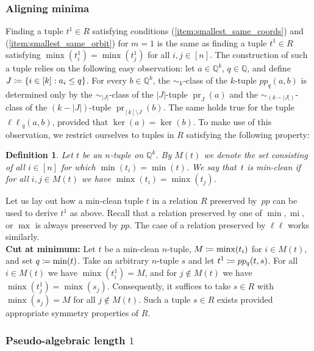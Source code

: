 \documentclass[a4paper,reqno, cleveref]{amsart}
\newcommand{\coloneqq}{\mathrel{\mathop:}\mathrel{\mkern-1.2mu}=}
\newtheorem{definition}[theorem]{Definition}
\newcommand{\Q}{\mathbb{Q}}
\newcommand{\br}[1]{[#1]}
\newcommand{\tup}{t}
\DeclareMathOperator{\pr}{pr}
\DeclareMathOperator{\mx}{mx}
\DeclareMathOperator{\mi}{mi}
\DeclareMathOperator{\minx}{minx}
\newcommand{\pp}[1]{pp_{#1}}
\newcommand{\llp}[1]{{\ell \ell}_{#1}}
\begin{document}
\subsubsection{Aligning minima}

Finding a tuple $\tup^1 \in R$ satisfying conditions (\ref{item:smallest_same_coords}) and (\ref{item:smallest_same_orbit})
for $m=1$ is the same as finding a tuple $\tup^1 \in R$ satisfying $\minx(\tup^1_i)=\minx(\tup^1_j)$ for all $i,j \in \br{n}$. The construction of such a tuple relies on the following easy observation:
%
let   $a \in \Q^k$,  $q \in \Q$, and define $J\coloneqq\{i \in \br k: a_i \leq q\}$. For every $b \in \Q^k$, the $\sim_k$-class of the $k$-tuple $\pp{q}(a,b)$  is  determined only by the $\sim_{|J|}$-class  of the $|J|$-tuple $\pr_J(a)$ and the $\sim_{(k-|J|)}$-class  of the $(k-|J|)$-tuple $\pr_{\br k \setminus J}(b)$. 
The same holds true for the tuple $\llp{q}(a,b)$, provided that $\ker(a)=\ker(b)$. To make use of this observation, we restrict ourselves to tuples in $R$ satisfying the following property:

\begin{definition} Let $\tup$ be an $n$-tuple on $\Q^k$. By $M(\tup)$ 
we denote the set consisting of all $i \in \br n$ for which $\min(\tup_i)=\min(\tup)$.  We say that~$\tup$ is \emph{min-clean} if for all $i,j \in M(\tup)$ we have $\minx(\tup_i)=\minx(\tup_j)$.
\end{definition}

Let us lay out how a min-clean tuple $\tup$ in a relation $R$ preserved by~$pp$ can be used to derive $\tup^1$ as above. Recall that a relation preserved by one of $\min, \mi,$ or $\mx$ is always preserved by $pp$. The case of a relation preserved by $\ell \ell$ works similarly. \\

\textbf{Cut at minimum:}
Let  $\tup$ be a min-clean $n$-tuple, $M\coloneqq \minx(\tup_i)$ for $i \in M(\tup)$, and set $q\coloneqq\min(\tup)$. Take an arbitrary $n$-tuple $s$ and let $\tup^1 \coloneqq pp_q(\tup,s)$. For all $i\in M(\tup)$ we have $\minx(\tup^1_i)=M$, and for $j \notin M(\tup)$ we have $\minx(\tup^1_j)=\minx(s_j)$. Consequently, it suffices to take $s\in R$ with $\minx(s_j)=M$ for all $j \notin M(\tup)$.  Such a tuple $s\in R$ exists provided  appropriate symmetry properties of $R$. 

\subsubsection{Pseudo-algebraic length  \texorpdfstring{$1$}{1}}\label{sect:al1}
\end{document}
